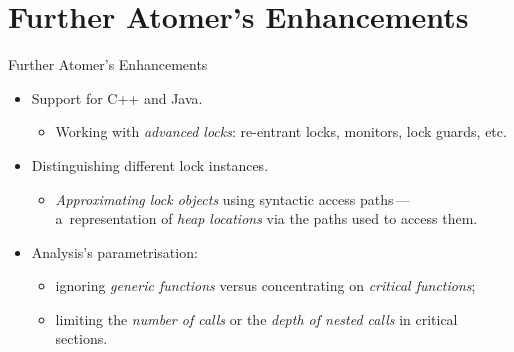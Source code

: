 \documentclass[10pt, xcolor=pdflatex, hyperref={unicode}, aspectratio=169]{beamer}
\begin{document}
\section{Further Atomer's Enhancements}
\begin{frame}{Further Atomer's Enhancements}
    \begin{itemize}\setlength\itemsep{2.5em}
        \item Support for \alert{C++} and \alert{Java}.
            \medskip
            \begin{itemize}
                \item Working with \emph{advanced locks}: re-entrant locks, monitors, lock guards, etc.
            \end{itemize}

        \item Distinguishing \alert{different lock instances}.
            \medskip
            \begin{itemize}
                \item \emph{Approximating lock objects} using \alert{syntactic access paths}\,---\,a~representation of \emph{heap locations} via the paths used to access them.
            \end{itemize}

        \item Analysis's \alert{parametrisation}:
            \medskip
            \begin{itemize}\setlength\itemsep{.8em}
                \item \alert{ignoring} \emph{generic functions} versus \alert{concentrating on} \emph{critical functions};

                \item \alert{limiting} the \emph{number of calls} or the \emph{depth of nested calls} in \alert{critical sections}.
            \end{itemize}
    \end{itemize}
\end{frame}


\end{document}
